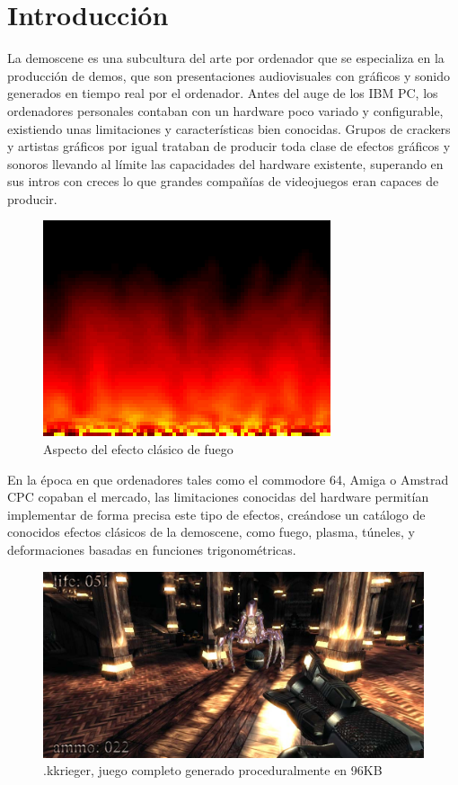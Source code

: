 \documentclass[a4,12pt]{article}
\begin{document}
\section{Introducción}
La demoscene es una subcultura del arte por ordenador que se especializa en la producción de demos, que son presentaciones audiovisuales con gráficos y sonido generados en tiempo real por el ordenador.
\newline
\newline
Antes del auge de los IBM PC, los ordenadores personales contaban con un hardware poco variado y configurable, existiendo unas limitaciones y características bien conocidas. Grupos de crackers y artistas gráficos por igual trataban de producir toda clase de efectos gráficos y sonoros llevando al límite las capacidades del hardware existente, superando en sus intros con creces lo que grandes compañías de videojuegos eran capaces de producir.
\newline
\newline
\begin{figure}[h!]
  \centering
    \includegraphics{img/fire}
  \caption{Aspecto del efecto clásico de fuego}
\end{figure}
En la época en que ordenadores tales como el commodore 64, Amiga o Amstrad CPC copaban el mercado, las limitaciones conocidas del hardware permitían implementar de forma precisa este tipo de efectos, creándose un catálogo de conocidos efectos clásicos de la demoscene, como fuego, plasma, túneles, y deformaciones basadas en funciones trigonométricas.
\newline
\newline
\begin{figure}[h!]
  \centering
    \includegraphics[scale=0.5]{img/kkrieger}
  \caption{.kkrieger, juego completo generado proceduralmente en 96KB}
\end{figure}
\end{document}
